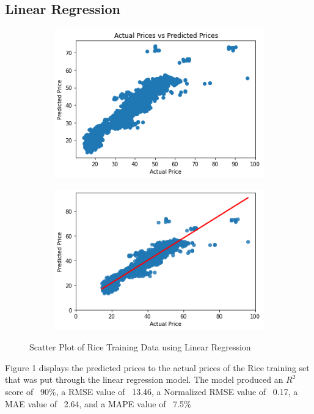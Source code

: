 \documentclass[runningheads]{llncs}
\begin{document}
\subsection{Linear Regression}
\begin{figure}
	\begin{subfigure}{.5\textwidth}
		\centering
		\includegraphics[width=.8\linewidth]{FIGURES/lin_train1.png}

	\end{subfigure}%
	\begin{subfigure}{.5\textwidth}
		\centering
		\includegraphics[width=.8\linewidth]{FIGURES/lin_train2.png}

	\end{subfigure}
	\caption{Scatter Plot of Rice Training Data using Linear Regression}
\end{figure}

Figure 1 displays the predicted prices to the actual prices of the Rice training set that was put through the linear regression model. The model produced an $R^2$ score of ~90\%, a RMSE value of ~13.46, a Normalized RMSE value of ~0.17, a MAE value of ~2.64, and a MAPE value of ~7.5\%
\end{document}
